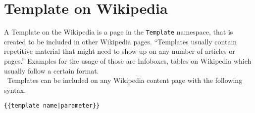 \section{Template on Wikipedia}

A Template on the Wikipedia is a page in the \texttt{\justify Template} namespace, that is created to be included in other Wikipedia pages. ``Templates usually contain repetitive material that might need to show up on any number of articles or pages.'' \citep{wiki:21} Examples for the usage of those are Infoboxes, tables on Wikipedia which usually follow a certain format. \\\
Templates can be included on any Wikipedia content page with the following syntax. \\
\begin{lstlisting}[frame=single] 
{{template name|parameter}}
\end{lstlisting}